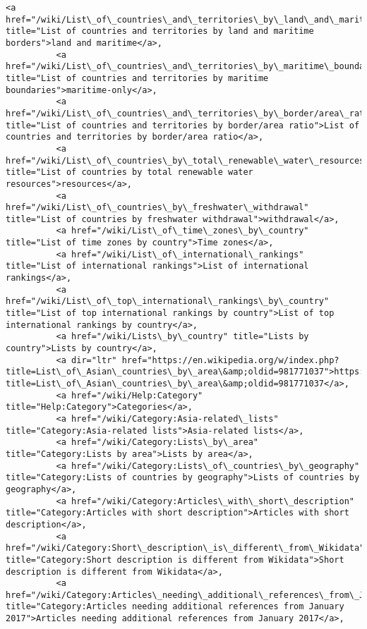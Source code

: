 \documentclass[11pt]{article}
\begin{document}
\begin{Verbatim}[commandchars=\\\{\}]
          <a href="/wiki/List\_of\_countries\_and\_territories\_by\_land\_and\_maritime\_borders" title="List of countries and territories by land and maritime borders">land and maritime</a>,
          <a href="/wiki/List\_of\_countries\_and\_territories\_by\_maritime\_boundaries" title="List of countries and territories by maritime boundaries">maritime-only</a>,
          <a href="/wiki/List\_of\_countries\_and\_territories\_by\_border/area\_ratio" title="List of countries and territories by border/area ratio">List of countries and territories by border/area ratio</a>,
          <a href="/wiki/List\_of\_countries\_by\_total\_renewable\_water\_resources" title="List of countries by total renewable water resources">resources</a>,
          <a href="/wiki/List\_of\_countries\_by\_freshwater\_withdrawal" title="List of countries by freshwater withdrawal">withdrawal</a>,
          <a href="/wiki/List\_of\_time\_zones\_by\_country" title="List of time zones by country">Time zones</a>,
          <a href="/wiki/List\_of\_international\_rankings" title="List of international rankings">List of international rankings</a>,
          <a href="/wiki/List\_of\_top\_international\_rankings\_by\_country" title="List of top international rankings by country">List of top international rankings by country</a>,
          <a href="/wiki/Lists\_by\_country" title="Lists by country">Lists by country</a>,
          <a dir="ltr" href="https://en.wikipedia.org/w/index.php?title=List\_of\_Asian\_countries\_by\_area\&amp;oldid=981771037">https://en.wikipedia.org/w/index.php?title=List\_of\_Asian\_countries\_by\_area\&amp;oldid=981771037</a>,
          <a href="/wiki/Help:Category" title="Help:Category">Categories</a>,
          <a href="/wiki/Category:Asia-related\_lists" title="Category:Asia-related lists">Asia-related lists</a>,
          <a href="/wiki/Category:Lists\_by\_area" title="Category:Lists by area">Lists by area</a>,
          <a href="/wiki/Category:Lists\_of\_countries\_by\_geography" title="Category:Lists of countries by geography">Lists of countries by geography</a>,
          <a href="/wiki/Category:Articles\_with\_short\_description" title="Category:Articles with short description">Articles with short description</a>,
          <a href="/wiki/Category:Short\_description\_is\_different\_from\_Wikidata" title="Category:Short description is different from Wikidata">Short description is different from Wikidata</a>,
          <a href="/wiki/Category:Articles\_needing\_additional\_references\_from\_January\_2017" title="Category:Articles needing additional references from January 2017">Articles needing additional references from January 2017</a>,

\end{Verbatim}
\end{document}
